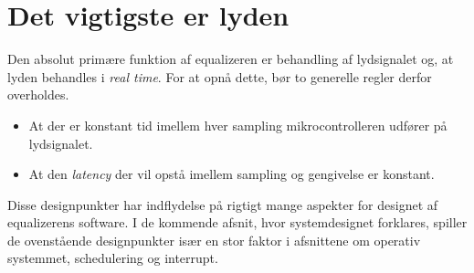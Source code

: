 \section{Det vigtigste er lyden}
Den absolut primære funktion af equalizeren er behandling af lydsignalet og, at lyden behandles i \textit{real time}.
For at opnå dette, bør to generelle regler derfor overholdes.
\begin{itemize}[noitemsep]
\item At der er konstant tid imellem hver sampling mikrocontrolleren udfører på lydsignalet.
\item At den \textit{latency} der vil opstå imellem sampling og gengivelse er konstant.
\end{itemize}

Disse designpunkter har indflydelse på rigtigt mange aspekter for designet af equalizerens software.
I de kommende afsnit, hvor systemdesignet forklares, spiller de ovenstående designpunkter især en stor faktor i afsnittene om operativ systemmet, schedulering og interrupt.
